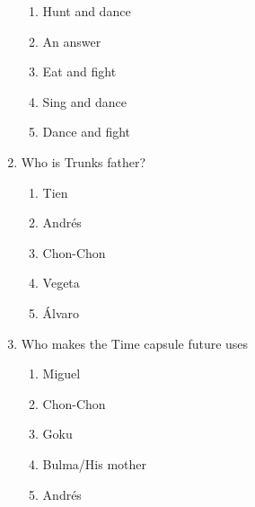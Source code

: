\documentclass[letterpaper,addpoints,answers,twocolumn,10pt]{exam}
\begin{document}
\begin{enumerate}[leftmargin=.2in]
\begin{enumerate}[noitemsep,leftmargin=0in]
\item  Hunt and dance
\item  An answer
\item  Eat and fight
\item  Sing and dance
\item  Dance and fight


\end{enumerate}



\item  Who is Trunks father?


\begin{enumerate}[noitemsep,leftmargin=0in]


\item  Tien
\item  Andrés
\item  Chon-Chon
\item  Vegeta
\item  Álvaro


\end{enumerate}



\item  Who makes the Time capsule future uses


\begin{enumerate}[noitemsep,leftmargin=0in]


\item  Miguel
\item  Chon-Chon
\item  Goku
\item  Bulma/His mother
\item  Andrés


\end{enumerate}



\end{enumerate}
\end{document}
